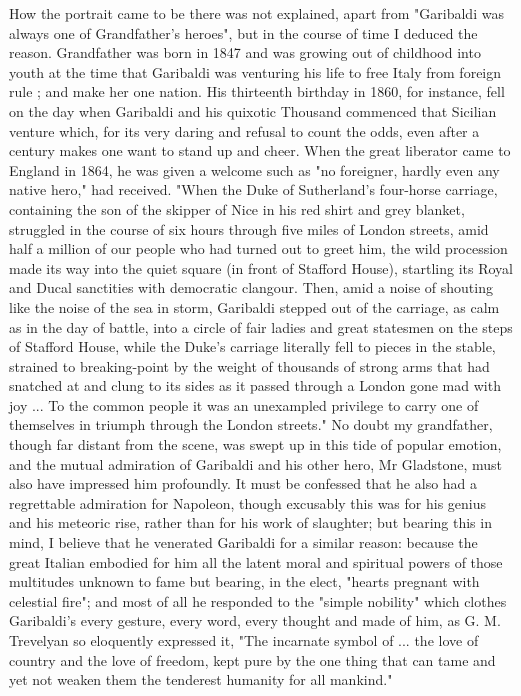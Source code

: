 How the portrait came to be there was not explained, apart from "Garibaldi was always one of Grandfather's heroes", but in the course of time I deduced the reason. Grandfather was born in 1847 and was growing out of childhood into youth at the time that Garibaldi was venturing his life to free Italy from foreign rule ; and make her one nation. His thirteenth birthday in 1860, for instance, fell on the day when Garibaldi and his quixotic Thousand commenced that Sicilian venture which, for its very daring and refusal to count the odds, even after a century makes one want to stand up and cheer. When the great liberator came to England in 1864, he was given a welcome such as "no foreigner, hardly even any native hero," had received. "When the Duke of Sutherland's four-horse carriage, containing the son of the skipper of Nice in his red shirt and grey blanket, struggled in the course of six hours through five miles of London streets, amid half a million of our people who had turned out to greet him, the wild procession made its way into the quiet square (in front of Stafford House), startling its Royal and Ducal sanctities with democratic clangour. Then, amid a noise of shouting like the noise of the sea in storm, Garibaldi stepped out of the carriage, as calm as in the day of battle, into a circle of fair ladies and great statesmen on the steps of Stafford House, while the Duke's carriage literally fell to pieces in the stable, strained to breaking-point by the weight of thousands of strong arms that had snatched at and clung to its sides as it passed through a London gone mad with joy ... To the common people it was an unexampled privilege to carry one of themselves in triumph through the London streets." No doubt my grandfather, though far distant from the scene, was swept up in this tide of popular emotion, and the mutual admiration of Garibaldi and his other hero, Mr Gladstone, must also have impressed him profoundly. It must be confessed that he also had a regrettable admiration for Napoleon, though excusably this was for his genius and his meteoric rise, rather than for his work of slaughter; but bearing this in mind, I believe that he venerated Garibaldi for a similar reason: because the great Italian embodied for him all the latent moral and spiritual powers of those multitudes unknown to fame but bearing, in the elect, "hearts pregnant with celestial fire"; and most of all he responded to the "simple nobility" which clothes Garibaldi's every gesture, every word, every thought and made of him, as G. M. Trevelyan so eloquently expressed it, "The incarnate symbol of ... the love of country and the love of freedom, kept pure by the one thing that can tame and yet not weaken them the tenderest humanity for all mankind."